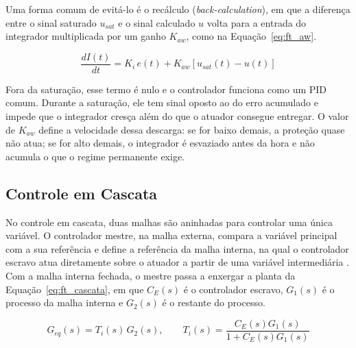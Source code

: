 \documentclass[a4paper,12pt]{article}
\begin{document}
\begin{justify}
    \hspace{4ex}Uma forma comum de evitá-lo é o recálculo (\textit{back-calculation}), em que a diferença entre o sinal saturado $u_{sat}$ e o sinal calculado $u$ volta para a entrada do integrador multiplicada por um ganho $K_{aw}$, como na Equação~\eqref{eq:ft_aw}.
\end{justify}

\begin{equation}
    \frac{dI(t)}{dt} = K_i\, e(t) + K_{aw}\left[u_{sat}(t) - u(t)\right]
    \label{eq:ft_aw}
\end{equation}

\begin{justify}
    \hspace{4ex}Fora da saturação, esse termo é nulo e o controlador funciona como um PID comum. Durante a saturação, ele tem sinal oposto ao do erro acumulado e impede que o integrador cresça além do que o atuador consegue entregar. O valor de $K_{aw}$ define a velocidade dessa descarga: se for baixo demais, a proteção quase não atua; se for alto demais, o integrador é esvaziado antes da hora e não acumula o que o regime permanente exige.
\end{justify}

\subsection{Controle em Cascata}

\begin{justify}
    \hspace{4ex}No controle em cascata, duas malhas são aninhadas para controlar uma única variável. O controlador mestre, na malha externa, compara a variável principal com a sua referência e define a referência da malha interna, na qual o controlador escravo atua diretamente sobre o atuador a partir de uma variável intermediária \cite{seborg2011}. Com a malha interna fechada, o mestre passa a enxergar a planta da Equação~\eqref{eq:ft_cascata}, em que $C_E(s)$ é o controlador escravo, $G_1(s)$ é o processo da malha interna e $G_2(s)$ é o restante do processo.
\end{justify}

\begin{equation}
    G_{eq}(s) = T_i(s)\, G_2(s), \qquad T_i(s) = \frac{C_E(s) G_1(s)}{1 + C_E(s) G_1(s)}
    \label{eq:ft_cascata}
\end{equation}
\end{document}
